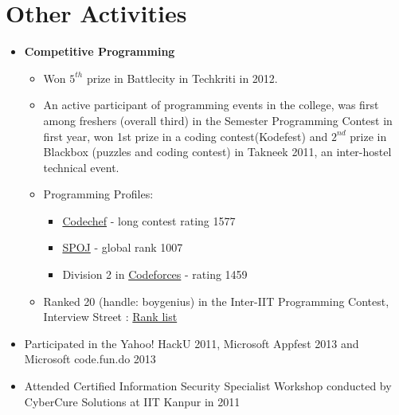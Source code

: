 \documentclass[margin,line]{resume}
\begin{document}
\begin{resume}
\begin{itemize}
  \end{itemize}

  
  \section{\mysidestyle Other Activities}
  
  \begin{itemize}
    
  \item  \textbf{\textsf Competitive Programming}
    \begin{itemize}
    \item Won $5^{th}$ prize in Battlecity in Techkriti in 2012.
    \item An active participant of programming events in the college, was first among freshers (overall third) in the Semester Programming Contest in first year, won 1st prize in a coding contest(Kodefest) and $2^{nd}$ prize in Blackbox (puzzles and coding contest) in Takneek 2011, an inter-hostel technical event.
    \item Programming Profiles:       
      \begin{itemize}
      \item \href{http://codechef.com/users/boygenius}{Codechef} - long contest rating 1577 %
      \item \href{http://spoj.com/users/pankaj\_prateek}{SPOJ} - global rank 1007
      \item Division 2 in \href{http://codeforces.com/profile/boygenius}{Codeforces} - rating 1459%
      \end{itemize}
    \item Ranked 20 (handle: boygenius) in the Inter-IIT Programming Contest, Interview Street : \href{https://iitvsiit.interviewstreet.com/challenges/dashboard/#leaderboard}{Rank list}
    \end{itemize}
  \item Participated in the Yahoo! HackU 2011, Microsoft Appfest 2013 and Microsoft code.fun.do 2013
  \item Attended Certified Information Security Specialist Workshop conducted by CyberCure Solutions at IIT Kanpur in 2011

  \end{itemize}


\end{resume}
\end{document}

